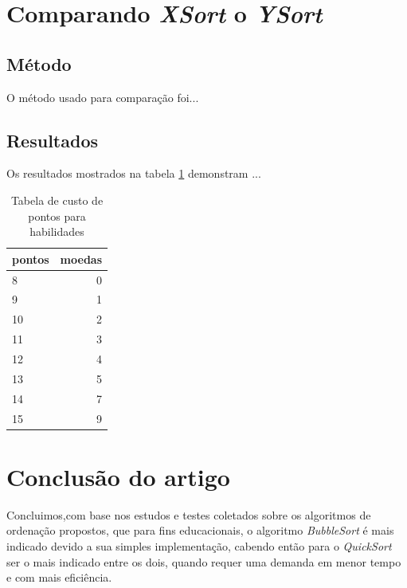 \documentclass[a4paper,10pt]{article} %
\begin{document}
\section{Comparando \textit{XSort} o \textit{YSort}}

\subsection{Método}

O método usado para comparação foi...

\subsection{Resultados}

Os resultados mostrados na tabela \ref{tab:resultados} demonstram ...

\begin{table}
\begin{center}
 \caption{Tabela de custo de pontos para habilidades}
\begin{tabular}{|l|r|}
  \hline \hline
  pontos & moedas \\ \hline \hline
   8 & 0 \\ \hline
   9 & 1 \\ \hline
  10 & 2 \\ \hline
  11 & 3 \\ \hline
  12 & 4 \\ \hline
  13 & 5 \\ \hline
  14 & 7 \\ \hline
  15 & 9 \\ \hline \hline
\end{tabular} 
\label{tab:resultados}
\end{center}
\end{table}


\section{Conclusão do artigo}

    Concluimos,com base nos estudos e testes coletados sobre os algoritmos de ordenação propostos, que para fins educacionais, o algoritmo \textit{BubbleSort} é mais indicado devido a sua simples implementação, cabendo então para o \textit{QuickSort} ser o mais indicado entre os dois, quando requer uma demanda em menor tempo e com mais eficiência.
\end{document}
